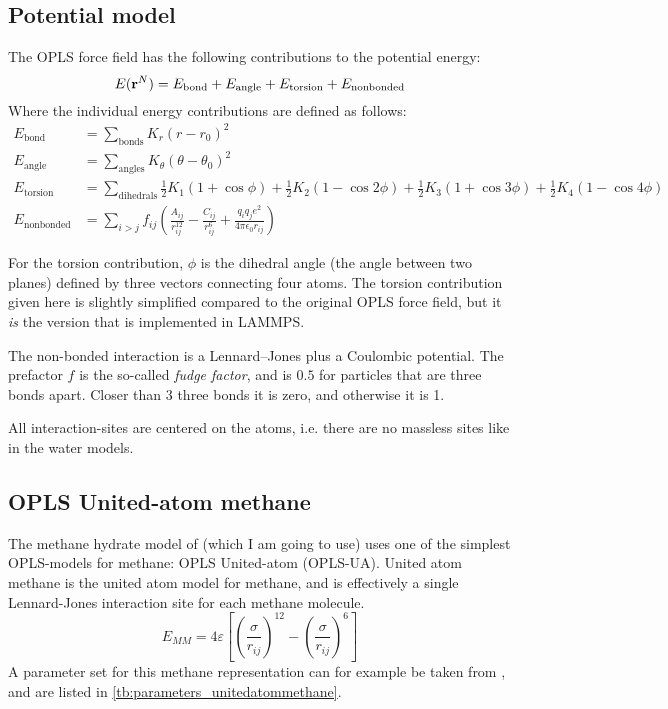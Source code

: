 \subsection{Potential model}
The OPLS force field has the following contributions to the potential energy:
\begin{equation}
	E(\mathbf{r}^N) = E_{\text{bond}} + E_{\text{angle}} + E_{\text{torsion}} + E_{\text{nonbonded}} 
\end{equation}
Where the individual energy contributions are defined as follows:
\begin{align}
	E_{\text{bond}} & = \sum_{\text{bonds}} K_r (r-r_0)^2 \\
	E_{\text{angle}} & = \sum_{\text{angles}} K_{\theta} (\theta-\theta_0)^2 \\
	E_{\text{torsion}} & = \sum_{\text{dihedrals}} \frac{1}{2}K_1(1+\cos\phi) + \frac{1}{2}K_2(1-\cos 2\phi) + \frac{1}{2}K_3(1+\cos 3\phi) + \frac{1}{2}K_4(1-\cos 4\phi) \\
	E_{\text{nonbonded}} & = \sum_{i>j} f_{ij} \left(\frac{A_{ij}}{r_{ij}^{12}} - \frac{C_{ij}}{r_{ij}^{6}}+ \frac{q_iq_je^2}{4\pi\epsilon_0 r_{ij}}\right)
\end{align}

For the torsion contribution, $\phi$ is the dihedral angle (the angle between two planes) defined by three vectors connecting four atoms. The torsion contribution given here is slightly simplified compared to the original OPLS force field, but it \emph{is} the version that is implemented in LAMMPS.

The non-bonded interaction is a Lennard--Jones plus a Coulombic potential. The prefactor $f$ is the so-called \emph{fudge factor}, and is $0.5$ for particles that are three bonds apart. Closer than 3 three bonds it is zero, and otherwise it is 1.

All interaction-sites are centered on the atoms, i.e. there are no massless sites like in the water models.

\subsection{OPLS United-atom methane}
The methane hydrate model of \citet{Walsh2009}  (which I am going to use) uses one of the simplest OPLS-models for methane: OPLS United-atom (OPLS-UA). United atom methane is the united atom model for methane, and is effectively a single Lennard-Jones interaction site for each methane molecule. 
\begin{equation}
	E_{MM} = 4\varepsilon\left[\left(\frac{\sigma}{r_{ij}}\right)^{12} - \left(\frac{\sigma}{r_{ij}}\right)^{6}\right]
	\label{eq:part1:lennardjonespotentialmethane}
\end{equation}
A parameter set for this methane representation can for example be taken from \cite{Martin1998}, and are listed in \ref{tb:parameters_unitedatommethane}. 

